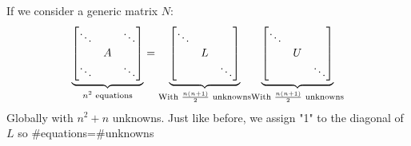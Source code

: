 If we consider a generic matrix $N$:
$$
\underlabel{
    \begin{bmatrix}
        \ddots & & \ddots \\
        & A &\\
        \ddots & & \ddots 
    \end{bmatrix}
}{$n^2$ equations}=
\underlabel{
    \begin{bmatrix}
        \ddots & &\\
        & L &\\
        & & \ddots 
    \end{bmatrix}
}{With $\frac{n(n+1)}{2}$ unknowns}
\underlabel{
    \begin{bmatrix}
        \ddots & &\\
        & U &\\
        & & \ddots 
    \end{bmatrix}
}{With $\frac{n(n+1)}{2}$ unknowns}
$$
Globally with $n^2+n$ unknowns. Just like before, we assign "1" to the diagonal of $L$ so \#equations=\#unknowns

